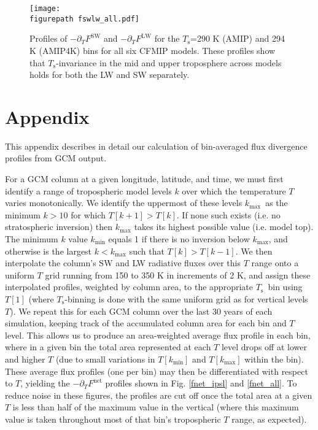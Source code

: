 \documentclass[10pt]{article}
\newcommand{\ppt}{\ensuremath{\partial_T}}
\newcommand{\FLW}{\ensuremath{F^\mathrm{LW}}}
\newcommand{\FSW}{\ensuremath{F^\mathrm{SW}}}
\newcommand{\Fnet}{\ensuremath{F^\mathrm{net}}}
\newcommand{\Ts}{\ensuremath{T_\mathrm{s}}}
\newcommand{\kmax}{\ensuremath{k_\mathrm{max}}}
\newcommand{\kmin}{\ensuremath{k_\mathrm{min}}}
\newcommand{\figurepath}{../figures/}
\begin{document}
 

\begin{figure}[t]
	\begin{center}
			\texttt{[image: \\figurepath fswlw\_all.pdf]}
		\caption{ Profiles of $-\ppt \FSW$ and $-\ppt \FLW$ for the \Ts=290 K (AMIP) and 294 K (AMIP4K) bins for all six CFMIP models. These profiles show that \Ts-invariance in the mid and upper troposphere across models holds for both the LW and SW separately. 
		\label{fswlw_all}
		}
	\end{center}
\end{figure}
 
\section{Appendix}
This appendix describes in detail our calculation of bin-averaged flux divergence profiles from GCM output.

For a GCM column at a given longitude, latitude, and time, we must first identify a range of tropospheric model levels $k$ over which the temperature $T$ varies monotonically. We identify the uppermost of these levels \kmax\ as the minimum  $k>10$ for which 
$T[k+1]>T[k]$. If none such exists (i.e. no stratospheric inversion) then $\kmax$ takes its highest possible value (i.e. model top).
The minimum $k$ value $\kmin$ equals 1 if there is no inversion below \kmax, and otherwise is the largest $k< \kmax$ such that $T[k]>T[k-1]$. We then interpolate the column's SW and LW radiative fluxes over this $T$ range onto a uniform $T$ grid running from 150 to 350 K in increments of 2 K, and assign these interpolated profiles, weighted by column area,  to the appropriate \Ts\ bin using $T[1]$ (where \Ts-binning is done with the same uniform grid as for vertical levels $T$). We repeat this for each GCM column over the last 30 years of each simulation, keeping track of the accumulated column area for each bin and $T$ level. This allows us to produce an area-weighted average flux profile in each bin, where in a given bin the total area represented at each $T$ level drops off at lower and higher $T$  (due to small variations in $T[\kmin]$ and $T[\kmax]$ within the bin). These average flux profiles (one per bin) may then be differentiated with respect to $T$, yielding the $-\ppt \Fnet$ profiles shown in Fig. \ref{fnet_ipsl} and \ref{fnet_all}. To reduce noise in these figures, the profiles are cut off once the total area at a given $T$ is less than half of the maximum value in the vertical (where this maximum value is taken throughout most of that bin's tropospheric $T$ range, as expected). 
\end{document}
